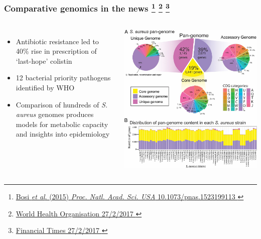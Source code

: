 
%
\begin{frame}
  \frametitle{Comparative genomics in the news
                   \footnote{\tiny{\href{http://dx.doi.org/10.1073/pnas.1523199113}{
                   Bosi \textit{et al}. (2015) \textit{Proc. Natl. Acad. Sci. USA} 10.1073/pnas.1523199113
}}}
                   \footnote{\tiny{\href{http://www.who.int/mediacentre/news/releases/2017/bacteria-antibiotics-needed/en/}{
                   World Health Organisation 27/2/2017
}}}
                   \footnote{\tiny{\href{https://www.ft.com/content/07ae84f2-fd06-11e6-96f8-3700c5664d30}{
                   Financial Times 27/2/2017
}}}
}
    \begin{columns}[c] 
        \begin{itemize}
          \item \textcolor{hutton_green}{Antibiotic resistance led to 40\% rise in prescription of `last-hope' colistin}
          \item \textcolor{hutton_blue}{12 bacterial priority pathogens identified by WHO}
          \item \textcolor{hutton_purple}{Comparison of hundreds of \textit{S. aureus} genomes produces models for metabolic capacity and insights into epidemiology}
        \end{itemize}
        \includegraphics[width=\textwidth]{images/palsson01} \\

\end{columns}
\end{frame}
